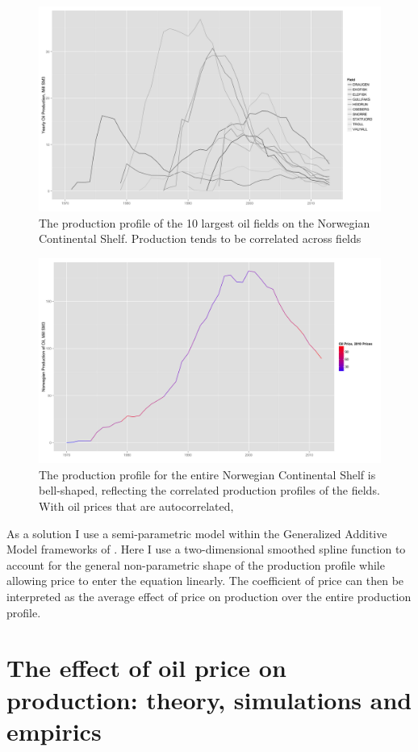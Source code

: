 \documentclass[12pt]{article}
\begin{document}
\begin{figure}
	\includegraphics[width=.8\textwidth]{figures/top10_production_print.png}
	\caption{The production profile of the 10 largest oil fields on the Norwegian Continental Shelf.  Production tends to be correlated across fields}
	\label{top10_production}	
	\end{figure}

\begin{figure}
	\includegraphics[width=.8\textwidth]{figures/oil_decline_print.png}
	\caption{The production profile for the entire Norwegian Continental Shelf is bell-shaped, reflecting the correlated production profiles of the fields.  With oil prices that are autocorrelated, }
	\label{oil_decline}
\end{figure}

As a solution I use a semi-parametric model within the Generalized Additive Model frameworks of \cite{hastie_generalized_1990}.  Here I use a two-dimensional smoothed spline function to account for the general non-parametric shape of the production profile while allowing price to enter the equation linearly.  The coefficient of price can then be interpreted as the average effect of price on production over the entire production profile.

\FloatBarrier
\section{The effect of oil price on production: theory, simulations and empirics}
\end{document}
